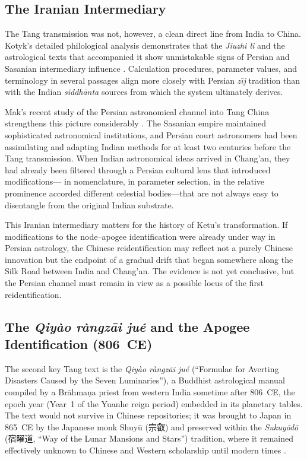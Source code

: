 \documentclass[10pt,a4paper]{article}
\newcommand{\zh}[1]{#1}
\begin{document}
\subsection*{The Iranian Intermediary}

The Tang transmission was not, however, a clean direct line from India
to China.  Kotyk's detailed philological analysis demonstrates that the
\textit{Jiuzhi li} and the astrological texts that accompanied it show
unmistakable signs of Persian and Sasanian intermediary influence
\cite{kotyk2018sinicization,kotyk2017buddhist}.  Calculation procedures,
parameter values, and terminology in several passages align more closely
with Persian \textit{z\={\i}j} tradition than with the Indian
\textit{siddh\=anta} sources from which the system ultimately derives.

Mak's recent study of the Persian astronomical channel into Tang China
strengthens this picture considerably \cite{mak2024persian}.  The
Sasanian empire maintained sophisticated astronomical institutions, and
Persian court astronomers had been assimilating and adapting Indian
methods for at least two centuries before the Tang transmission.  When
Indian astronomical ideas arrived in Chang'an, they had already been
filtered through a Persian cultural lens that introduced modifications---
in nomenclature, in parameter selection, in the relative prominence
accorded different celestial bodies---that are not always easy to
disentangle from the original Indian substrate.

This Iranian intermediary matters for the history of Ketu's
transformation.  If modifications to the node--apogee identification
were already under way in Persian astrology, the Chinese reidentification
may reflect not a purely Chinese innovation but the endpoint of a
gradual drift that began somewhere along the Silk Road between India
and Chang'an.  The evidence is not yet conclusive, but the Persian
channel must remain in view as a possible locus of the first
reidentification.

\subsection*{The \textit{Qiy\`ao r\`angz\=ai ju\'e} and the Apogee Identification (806~CE)}

The second key Tang text is the \textit{Qiy\`ao r\`angz\=ai ju\'e}
(``Formulae for Averting Disasters Caused by the Seven
Luminaries''), a Buddhist astrological manual compiled by a
Br\=ahma\d{n}a priest from western India sometime after 806~CE, the
epoch year (Year~1 of the Yuanhe reign period) embedded in its
planetary tables.  The text would not survive in Chinese repositories;
it was brought to Japan in 865~CE by the Japanese monk Shuy\=u
(\zh{宗叡}) and preserved within the \textit{Sukuy\=od\=o}
(\zh{宿曜道}, ``Way of the Lunar Mansions and Stars'') tradition, where
it remained effectively unknown to Chinese and Western scholarship until
modern times \cite{kotyk2017buddhist}.
\end{document}
